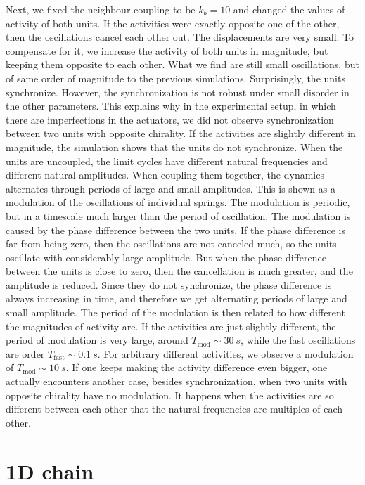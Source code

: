 \documentclass[11pt, a4paper]{article} %
\begin{document}
Next, we fixed the neighbour coupling to be $k_b=10$ and changed the values of activity of both units. 
If the activities were exactly opposite one of the other, then the oscillations cancel each other out. 
The displacements are very small. To compensate for it, we increase the activity of both units in magnitude, 
but keeping them opposite to each other. What we find are still small oscillations, but of same order of 
magnitude to the previous simulations. Surprisingly, the units synchronize. However, the synchronization is 
not robust under small disorder in the other parameters. This explains why in the experimental setup, in 
which there are imperfections in the actuators, we did not observe synchronization between two units with 
opposite chirality. 
If the activities are slightly different in magnitude, the simulation shows that the units do not synchronize. 
When the units are uncoupled, the limit cycles have different natural frequencies and different natural amplitudes. 
When coupling them together, the dynamics alternates through periods of large and small amplitudes. This is shown 
as a modulation of the oscillations of individual springs. The modulation is periodic, but in a timescale 
much larger than the period of oscillation. The modulation is caused by the phase difference 
between the two units. If the phase difference is far from being zero, then the oscillations are not canceled much,
so the units oscillate with considerably large amplitude. But when the phase difference between the units is close 
to zero, then the cancellation is much greater, and the amplitude is reduced. Since they do not synchronize, the 
phase difference is always increasing in time, and therefore we get alternating periods of large and small amplitude. 
The period of the modulation is then related to how different the magnitudes of activity are. If the activities 
are just slightly different, the period of modulation is very large, around $T_\text{mod}\sim \SI{30}{s}$, while the 
fast oscillations are order $T_\text{fast}\sim \SI{0.1}{s}$. For arbitrary different activities, we observe a 
modulation of $T_\text{mod}\sim \SI{10}{s}$. If one keeps making the activity difference even bigger, 
one actually encounters another case, besides synchronization, when two units with opposite chirality have no modulation. 
It happens when the activities are so different between each other that the natural frequencies are multiples of each other. 

\section{1D chain}
\label{sec:chain}
\end{document}
